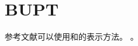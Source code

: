 \documentclass[twoside]{article}
\begin{document}
    \section*{BUPT}

参考文献可以使用\cite{BUPT_Thesis_Format_2014}和\parencite{BUPT_Thesis_Format_2004}的表示方法。
\nocite{SANGUOYANYI}
\nocite{CHANGBANPO}
\nocite{CITATION_BOOK,CITATION_ARTICLE,CITATION_PROCEEDINGS,CITATION_INPROCEEDINGS,
CITATION_TECHREPORT,CITATION_STANDARD,CITATION_PATENT,CITATION_NEWSPAPER,CITATION_ELECTRONIC}。

\printbibliography

    
\end{document}
